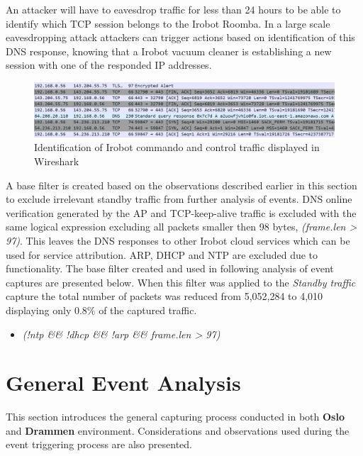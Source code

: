 An attacker will have to eavesdrop traffic for less than 24 hours to be able to identify which \gls{TCP} session belongs to the Irobot Roomba. In a large scale eavesdropping attack attackers can trigger actions based on identification of this \gls{DNS} response, knowing that a Irobot vacuum cleaner is establishing a new session with one of the responded \gls{IP} addresses. 


\begin{figure}[H]
    \centering
    \includegraphics[width=\textwidth]{figures/wireshark_irobot_cloud_dns.png}
    \caption{Identification of Irobot commando and control traffic displayed in Wireshark}
    \label{fig:tcp_keep-change_dns}
\end{figure}

A base filter is created based on the observations described earlier in this section to exclude irrelevant standby traffic from further analysis of events. \gls{DNS} online verification generated by the \gls{AP} and \gls{TCP}-keep-alive traffic is excluded with the same logical expression excluding all packets smaller then 98 bytes, \textit{(frame.len > 97)}. This leaves the \gls{DNS} responses to other Irobot cloud services which can be used for service attribution. \gls{ARP}, \gls{DHCP} and \gls{NTP} are excluded due to functionality. The base filter created and used in following analysis of event captures are presented below. When this filter was applied to the \textit{Standby traffic} capture the total number of packets was reduced from 5,052,284 to 4,010 displaying only 0.8\% of the captured traffic.

\begin{itemize}
    \item \textit{(!ntp \&\& !dhcp \&\& !arp \&\& frame.len > 97)}
\end{itemize}


\section{General Event Analysis}

 This section introduces the general capturing process conducted in both \textbf{Oslo} and \textbf{Drammen} environment. Considerations and observations used during the event triggering process are also presented. 

